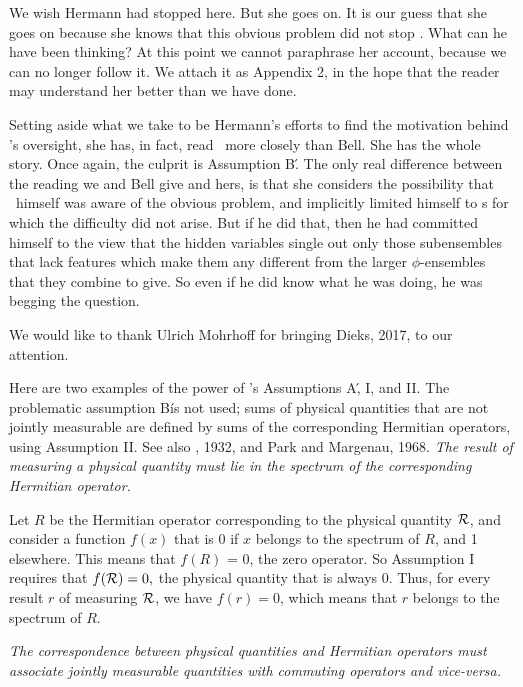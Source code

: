 \bigskip

  We wish Hermann had stopped here.   But she goes  on.   It is our guess that she goes on because she knows that this obvious problem did not stop \vN.   What can he have been thinking?   At this point we cannot paraphrase her account, because we can no longer  follow it.   We attach it as  Appendix 2, in the hope that the reader may understand her better than we have done.   

Setting aside what we take to be Hermann's  efforts to find the motivation behind  \vN's oversight, she has, in fact, read \vN\ more closely than Bell.   She has the whole story.  Once again, the culprit is Assumption B\'.    The only real difference between the reading we and Bell give and hers, is that she considers the possibility that \vN\  himself was aware of the obvious problem, and implicitly limited himself to \se s for which the difficulty did not arise.    But if he did that, then he had committed himself to the view that the hidden variables single out only those subensembles that  lack features which make them any different from the larger $\phi$-ensembles that they combine to give.  So even if he did know what he was doing, he was begging the question. 

\bigskip
{}
\medskip
We would like to thank Ulrich Mohrhoff for bringing Dieks, 2017, to our attention.


\bigskip
{}
\medskip

Here are two examples of the power of \vN's Assumptions A\', I, and II.   The problematic assumption B\' is not used;   sums of physical quantities that are not jointly measurable are defined by sums of the corresponding Hermitian operators, using Assumption II.  See also \vN, 1932, and Park and Margenau, 1968.  
\bigskip
{}  {\sl The result of measuring a physical quantity must lie in the spectrum of the corresponding Hermitian operator.} 
\medskip 

Let $R$ be the Hermitian operator corresponding to the physical quantity ${\cal R}$, and consider a function $f(x)$ that is 0 if $x$ belongs to the spectrum of $R$, and 1 elsewhere. This means that $f(R)$ = 0, the zero operator. So Assumption I requires that  $f({\cal R}) = 0,$ the physical quantity that is always 0.
Thus, for every result $r$ of measuring ${\cal R}$, we have $f(r)=0$, which means that $r$ belongs to the spectrum of $R$.

\bigskip
{}  {\sl  The correspondence between physical quantities and Hermitian operators must associate jointly measurable quantities with commuting operators and vice-versa.}
\medskip

